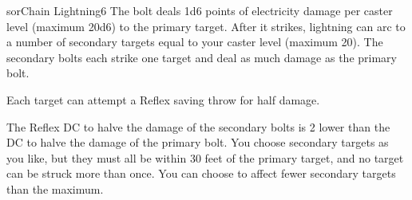 \begin{spellcard}{sor}{Chain Lightning}{6}
  The bolt deals 1d6 points of electricity damage per caster level
  (maximum 20d6) to the primary target. After it strikes, lightning can
  arc to a number of secondary targets equal to your caster level (maximum
  20). The secondary bolts each strike one target and deal as much damage
  as the primary bolt.

  Each target can attempt a Reflex saving throw for half damage.

  The Reflex DC to halve the damage of the secondary bolts is 2 lower than
  the DC to halve the damage of the primary bolt. You choose secondary
  targets as you like, but they must all be within 30 feet of the primary
  target, and no target can be struck more than once. You can choose to
  affect fewer secondary targets than the maximum.

\end{spellcard}
